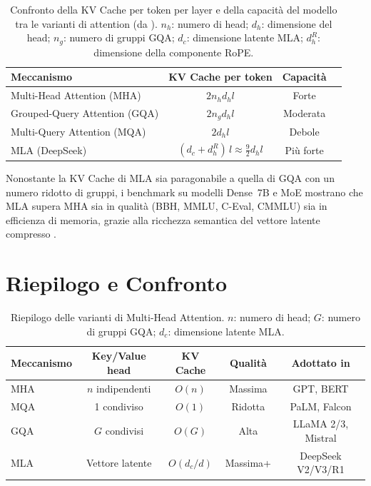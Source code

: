 \begin{table}[H]
  \centering
  \caption{Confronto della KV Cache per token per layer e della capacità del
           modello tra le varianti di attention (da \citet{deepseekv2_2024}).
           $n_h$: numero di head; $d_h$: dimensione del head; $n_g$: numero
           di gruppi GQA; $d_c$: dimensione latente MLA; $d_h^R$: dimensione
           della componente RoPE.}
  \label{tab:attention-comparison}
  \small
  \begin{tabular}{lccc}
    \toprule
    \textbf{Meccanismo} & \textbf{KV Cache per token} & \textbf{Capacità} \\
    \midrule
    Multi-Head Attention (MHA)   & $2 n_h d_h l$              & Forte    \\
    Grouped-Query Attention (GQA) & $2 n_g d_h l$             & Moderata \\
    Multi-Query Attention (MQA)  & $2 d_h l$                  & Debole   \\
    \midrule
    MLA (DeepSeek)               & $(d_c + d_h^R)\,l \approx \tfrac{9}{2} d_h l$ & Più forte \\
    \bottomrule
  \end{tabular}
\end{table}

\noindent Nonostante la KV Cache di MLA sia paragonabile a quella di GQA con
un numero ridotto di gruppi, i benchmark su modelli Dense~7B e MoE mostrano
che MLA supera MHA sia in qualità (BBH, MMLU, C-Eval, CMMLU) sia in efficienza
di memoria, grazie alla ricchezza semantica del vettore latente compresso
\citep{deepseekv2_2024}.

\section{Riepilogo e Confronto}
\label{sec:attention-summary}

\begin{table}[H]
  \centering
  \caption{Riepilogo delle varianti di Multi-Head Attention. $n$: numero di
           head; $G$: numero di gruppi GQA; $d_c$: dimensione latente MLA.}
  \label{tab:attention-summary}
  \small
  \begin{tabular}{lcccc}
    \toprule
    \textbf{Meccanismo} & \textbf{Key/Value head} & \textbf{KV Cache} & \textbf{Qualità} & \textbf{Adottato in} \\
    \midrule
    MHA  & $n$ indipendenti  & $O(n)$     & Massima  & GPT, BERT \\
    MQA  & 1 condiviso       & $O(1)$     & Ridotta  & PaLM, Falcon \\
    GQA  & $G$ condivisi     & $O(G)$     & Alta     & LLaMA 2/3, Mistral \\
    MLA  & Vettore latente   & $O(d_c/d)$ & Massima+ & DeepSeek V2/V3/R1 \\
    \bottomrule
  \end{tabular}
\end{table}

